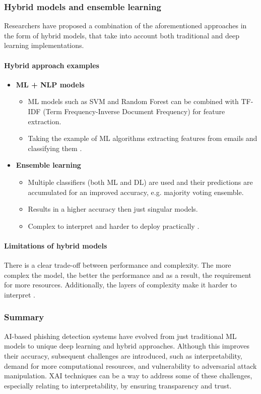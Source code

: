 \subsubsection*{Hybrid models and ensemble learning}
Researchers have proposed a combination of the aforementioned approaches in the form of hybrid models, that take into account both traditional and deep learning implementations.

\paragraph{Hybrid approach examples}
\begin{itemize}
    \item \textbf{ML + NLP models}
    \begin{itemize}
        \item ML models such as SVM and Random Forest can be combined with TF-IDF (Term Frequency-Inverse Document Frequency) for feature extraction.
        \item Taking the example of ML algorithms extracting features from emails and classifying them \citep{bountakas2023helphed}.
    \end{itemize}
    \item \textbf{Ensemble learning}
    \begin{itemize}
        \item Multiple classifiers (both ML and DL) are used and their predictions are accumulated for an improved accuracy, e.g. majority voting ensemble.
        \item Results in a higher accuracy then just singular models.
        \item Complex to interpret and harder to deploy practically \citep{verma2022classification}.
    \end{itemize}
\end{itemize}

\paragraph{Limitations of hybrid models}
There is a clear trade-off between performance and complexity. The more complex the model, the better the performance and as a result, the requirement for more resources. Additionally, the layers of complexity make it harder to interpret \citep{das2019sok}.

\subsubsection*{Summary}
AI-based phishing detection systems have evolved from just traditional ML models to unique deep learning and hybrid approaches. Although this improves their accuracy, subsequent challenges are introduced, such as interpretability, demand for more computational resources, and vulnerability to adversarial attack manipulation. XAI techniques can be a way to address some of these challenges, especially relating to interpretability, by ensuring transparency and trust.\newline

